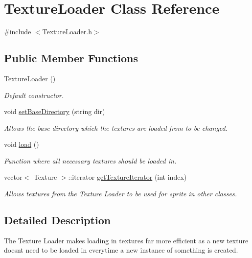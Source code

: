 \hypertarget{class_texture_loader}{}\section{Texture\+Loader Class Reference}
\label{class_texture_loader}


{\ttfamily \#include $<$Texture\+Loader.\+h$>$}

\subsection*{Public Member Functions}
\begin{DoxyCompactItemize}
\item 
\hyperlink{class_texture_loader_aafa6ca3bdbee3874a73aafae39d5c804}{Texture\+Loader} ()
\begin{DoxyCompactList}\small\item\em Default constructor. \end{DoxyCompactList}\item 
void \hyperlink{class_texture_loader_a8c6ef2773da422d2b40a98e839c0ccf8}{set\+Base\+Directory} (string dir)
\begin{DoxyCompactList}\small\item\em Allows the base directory which the textures are loaded from to be changed. \end{DoxyCompactList}\item 
void \hyperlink{class_texture_loader_a887d3fd9f794498a8273f65d994e9250}{load} ()
\begin{DoxyCompactList}\small\item\em Function where all necessary textures should be loaded in. \end{DoxyCompactList}\item 
vector$<$ Texture $>$\+::iterator \hyperlink{class_texture_loader_aa579911f752f74d993459639b326ed41}{get\+Texture\+Iterator} (int index)
\begin{DoxyCompactList}\small\item\em Allows textures from the Texture Loader to be used for sprite in other classes. \end{DoxyCompactList}\end{DoxyCompactItemize}


\subsection{Detailed Description}
The Texture Loader makes loading in textures far more efficient as a new texture doesn\textquotesingle{}t need to be loaded in everytime a new instance of something is created.

